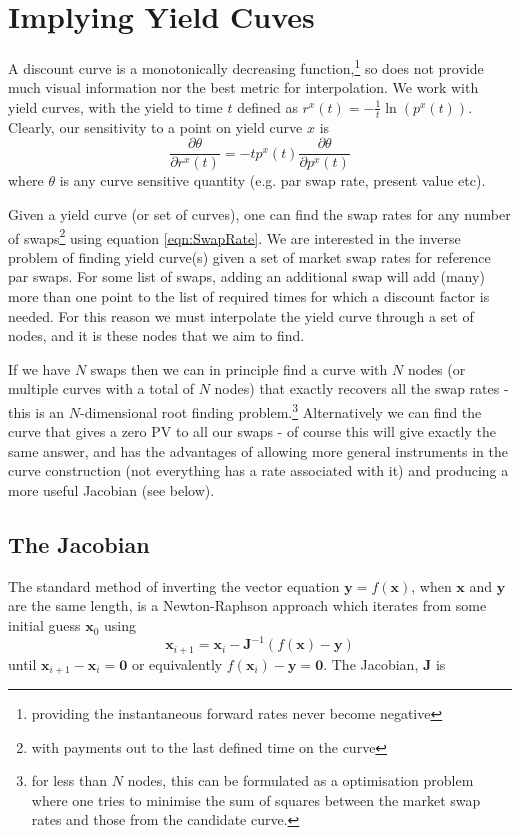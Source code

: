 \section{Implying Yield Cuves}
A discount curve is a monotonically decreasing function,\footnote{providing the instantaneous forward rates never become negative} so does not provide much visual information nor  the best metric for interpolation. We work with yield curves, with the yield to time $t$ defined as $r^x(t)=-\frac{1}{t}\ln\left(p^x(t)\right)$. Clearly, our sensitivity to a point on yield curve $x$ is
%
\begin{equation}
\frac{\partial \theta}{\partial r^{x}(t)} = -tp^x(t)\frac{\partial \theta}{\partial p^{x}(t)}
\end{equation}
%
where $\theta$ is any curve sensitive quantity (e.g. par swap rate, present value etc). 

Given a yield curve (or set of curves), one can find the swap rates for any number of swaps\footnote{with payments out to the last defined time on the curve}  using equation \ref{eqn:SwapRate}.  We are interested in the inverse problem of finding yield curve(s) given a set of market swap rates for reference par swaps. For some list of swaps, adding an additional swap will add (many) more than one point to the list of required times for which a discount factor is needed. For this reason we must interpolate the yield curve through a set of nodes, and it is these nodes that we aim to find. 

If we have $N$ swaps then we can in principle find a curve with $N$ nodes (or multiple curves with a total of $N$ nodes) that exactly recovers all the swap rates - this is an $N$-dimensional root finding problem.\footnote{for less than $N$ nodes, this can be formulated as a optimisation  problem where one tries to minimise the sum of squares between the market swap rates and those from the candidate curve.}  Alternatively we can find the curve that gives a zero PV to all our swaps - of course this will give exactly the same answer, and has the advantages of allowing more general instruments in the curve construction (not everything has a rate associated with it) and producing a more useful Jacobian (see below).


\subsection{The Jacobian}

The standard method of inverting the vector equation $\mathbf{y} = f(\mathbf{x})$,  when  $\mathbf{x}$ and  $\mathbf{y}$ are the same length, is a Newton-Raphson approach which iterates from some initial guess $\mathbf{x}_0$ using
\begin{equation*}
\mathbf{x}_{i+1} = \mathbf{x}_i - \mathbf{J}^{-1}(f(\mathbf{x})-\mathbf{y} )
\end{equation*}
until $\mathbf{x}_{i+1} - \mathbf{x}_i= \mathbf{0}$ or equivalently $f(\mathbf{x}_i)-\mathbf{y} =\mathbf{0}$. The Jacobian, $\mathbf{J}$ is

